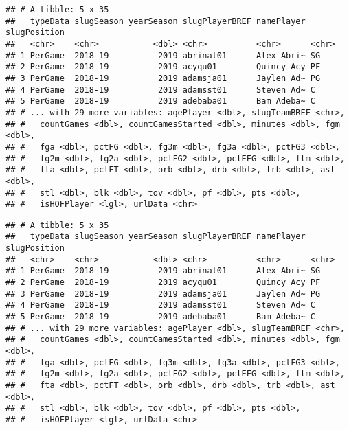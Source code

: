 \documentclass[]{article}
\newenvironment{Shaded}{\begin{snugshade}}{\end{snugshade}}
\newcommand{\KeywordTok}[1]{\textcolor[rgb]{0.13,0.29,0.53}{\textbf{#1}}}
\newcommand{\DecValTok}[1]{\textcolor[rgb]{0.00,0.00,0.81}{#1}}
\newcommand{\StringTok}[1]{\textcolor[rgb]{0.31,0.60,0.02}{#1}}
\newcommand{\ControlFlowTok}[1]{\textcolor[rgb]{0.13,0.29,0.53}{\textbf{#1}}}
\newcommand{\OperatorTok}[1]{\textcolor[rgb]{0.81,0.36,0.00}{\textbf{#1}}}
\newcommand{\NormalTok}[1]{#1}
\begin{document}
\begin{verbatim}
## # A tibble: 5 x 35
##   typeData slugSeason yearSeason slugPlayerBREF namePlayer slugPosition
##   <chr>    <chr>           <dbl> <chr>          <chr>      <chr>       
## 1 PerGame  2018-19          2019 abrinal01      Alex Abri~ SG          
## 2 PerGame  2018-19          2019 acyqu01        Quincy Acy PF          
## 3 PerGame  2018-19          2019 adamsja01      Jaylen Ad~ PG          
## 4 PerGame  2018-19          2019 adamsst01      Steven Ad~ C           
## 5 PerGame  2018-19          2019 adebaba01      Bam Adeba~ C           
## # ... with 29 more variables: agePlayer <dbl>, slugTeamBREF <chr>,
## #   countGames <dbl>, countGamesStarted <dbl>, minutes <dbl>, fgm <dbl>,
## #   fga <dbl>, pctFG <dbl>, fg3m <dbl>, fg3a <dbl>, pctFG3 <dbl>,
## #   fg2m <dbl>, fg2a <dbl>, pctFG2 <dbl>, pctEFG <dbl>, ftm <dbl>,
## #   fta <dbl>, pctFT <dbl>, orb <dbl>, drb <dbl>, trb <dbl>, ast <dbl>,
## #   stl <dbl>, blk <dbl>, tov <dbl>, pf <dbl>, pts <dbl>,
## #   isHOFPlayer <lgl>, urlData <chr>
\end{verbatim}

\begin{Shaded}
\end{Shaded}

\begin{verbatim}
## # A tibble: 5 x 35
##   typeData slugSeason yearSeason slugPlayerBREF namePlayer slugPosition
##   <chr>    <chr>           <dbl> <chr>          <chr>      <chr>       
## 1 PerGame  2018-19          2019 abrinal01      Alex Abri~ SG          
## 2 PerGame  2018-19          2019 acyqu01        Quincy Acy PF          
## 3 PerGame  2018-19          2019 adamsja01      Jaylen Ad~ PG          
## 4 PerGame  2018-19          2019 adamsst01      Steven Ad~ C           
## 5 PerGame  2018-19          2019 adebaba01      Bam Adeba~ C           
## # ... with 29 more variables: agePlayer <dbl>, slugTeamBREF <chr>,
## #   countGames <dbl>, countGamesStarted <dbl>, minutes <dbl>, fgm <dbl>,
## #   fga <dbl>, pctFG <dbl>, fg3m <dbl>, fg3a <dbl>, pctFG3 <dbl>,
## #   fg2m <dbl>, fg2a <dbl>, pctFG2 <dbl>, pctEFG <dbl>, ftm <dbl>,
## #   fta <dbl>, pctFT <dbl>, orb <dbl>, drb <dbl>, trb <dbl>, ast <dbl>,
## #   stl <dbl>, blk <dbl>, tov <dbl>, pf <dbl>, pts <dbl>,
## #   isHOFPlayer <lgl>, urlData <chr>
\end{verbatim}
\end{document}
